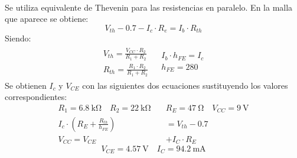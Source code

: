 \paragraph{}
Se utiliza equivalente de Thevenin para las resistencias en paralelo. En la malla que aparece se obtiene:
$$V_{th} - 0.7 - I_c \cdot R_e = I_b \cdot R_{th}$$
Siendo:
\renewcommand{\arraystretch}{1.5}
\[
\begin{array}{rl} 
      \begin{array}{l}
	 V_{th} = \frac{V_{CC} \cdot R_2}{R_1+R_2} \\
	 R_{th} = \frac{R_1 \cdot R_2}{R_1+R_2}
      \end{array}
      &
      \begin{array}{l}
	 I_b \cdot h_{FE}= I_c \\
	 h_{FE} = 280
      \end{array}
\end{array}
\]
Se obtienen $I_c$ y $V_{CE}$ con las siguientes dos ecuaciones sustituyendo los valores correspondientes:
\begin{align*}
   R_1=\SI{6.8}{\kilo\ohm} \quad R_2=\SI{22}{\kilo\ohm} \quad &R_E=\SI{47}{\ohm} \quad V_{CC} = \SI{9}{\volt} \\
   I_c \cdot \left( R_E+ \frac{R_{th}}{h_{FE}}\right) &= V_{th} - 0.7 \\
   V_{CC} = V_{CE} &+ I_C \cdot R_E
\end{align*}
\begin{equation}
   V_{CE}= \SI{4.57}{\volt} \quad I_C = \SI{94.2}{\milli\ampere}
\end{equation}
